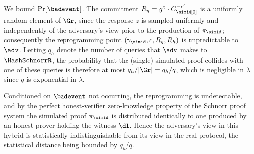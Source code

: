     We bound $\Pr[\badevent]$. The commitment $R_g = g^{z} \cdot C_\simid[0]^{-c'}$ is a uniformly
    random element of $\Gr$, since the response $z$ is sampled uniformly and independently of the
    adversary's view prior to the production of $\pi_\simid$; consequently the reprogramming point
    $(\gamma_\simid, c, R_g, R_h)$ is unpredictable to $\adv$. Letting $q_h$ denote the number of
    queries that $\adv$ makes to $\HashSchnorrR$, the probability that the (single) simulated proof
    collides with one of these queries is therefore at most $q_h / \lvert \Gr \rvert = q_h / q$,
    which is negligible in $\lambda$ since $q$ is exponential in $\lambda$.

    Conditioned on $\badevent$ not occurring, the reprogramming is undetectable, and by the perfect
    honest-verifier zero-knowledge property of the Schnorr proof system the simulated proof
    $\pi_\simid$ is distributed identically to one produced by an honest prover holding the witness
    $\dl$. Hence the adversary's view in this hybrid is statistically indistinguishable from its view
    in the real protocol, the statistical distance being bounded by $q_h / q$.
